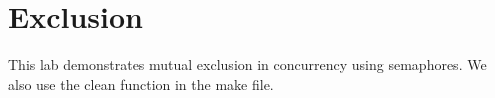 \hypertarget{index_Mutual}{}\section{Exclusion}\label{index_Mutual}
This lab demonstrates mutual exclusion in concurrency using semaphores. We also use the clean function in the make file. 